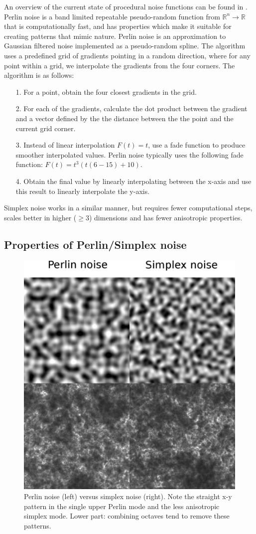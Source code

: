 \documentclass[aps,pre,twocolumn,letterpaper,floatfix,showpacs]{revtex4}
\begin{document}
An overview of the current state of procedural noise functions can be
found in \cite{lagae:2010}.  Perlin noise \citep{perlin:2002} 
is a band limited repeatable pseudo-random function
from $\mathbb R^n \to \mathbb R$ that is computationally fast, and has
properties which make it suitable for creating patterns that mimic
nature. Perlin noise is an approximation to Gaussian filtered noise
implemented as a pseudo-random spline. The algorithm uses a predefined
grid of gradients pointing in a random direction, where for any point
within a grid, we interpolate the gradients from the four corners. The
algorithm is as follows:
\begin{itemize}
  \item[1.] For a point, obtain the four closest gradients in the grid.
   \item [2.] For each of the gradients, calculate the dot product
     between the gradient and a vector defined by the  the distance
     between the the point and the current grid corner. 
   \item [3.] Instead of linear interpolation $F(t) = t$, use a fade function to produce smoother interpolated values. Perlin noise typically uses the following fade function: $F(t) = t ^3 (t  (6 - 15) + 10)$.
    \item [4.] Obtain the final value by linearly interpolating between the x-axis and
      use this result to linearly interpolate the y-axis. 
\end{itemize} 
Simplex noise works in a similar manner, but requires fewer
computational steps, scales better in higher ($\ge 3$) dimensions and has fewer 
anisotropic properties. 


\subsection{Properties of Perlin/Simplex noise}
\begin{figure}
\includegraphics[width=.5\textwidth]{noise.eps}
\caption{Perlin noise (left) versus simplex noise (right). Note the
  straight x-y pattern in the single upper Perlin mode and the less
  anisotropic simplex mode. Lower part: combining octaves tend
  to remove these patterns.}
\label{fig:noise}
\end{figure}
\end{document}

